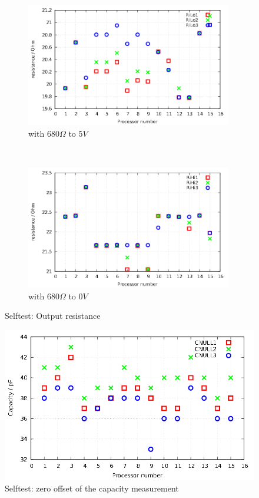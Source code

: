 \begin{figure}[H]
  \begin{subfigure}[b]{9cm}
  \centering
    \includegraphics[width=9cm]{../GNU/SelfTRiLo.pdf}
    \caption{with \(680\Omega\) to \(5V\)}
    \label{fig:SelfTRoL}
  \end{subfigure}
  ~
  \begin{subfigure}[b]{9cm}
  \centering
    \includegraphics[width=9cm]{../GNU/SelfTRiHi.pdf}
    \caption{with \(680\Omega\) to \(0V\)}
    \label{fig:SelfTRoH}
  \end{subfigure}
  \caption{Selftest: Output resistance}
\end{figure}

\begin{figure}[H]
  \centering
  \includegraphics[width=16cm]{../GNU/SelfTcap0.pdf}
  \caption{Selftest: zero offset of the capacity measurement}
  \label{fig:SelfTcap}
\end{figure}

